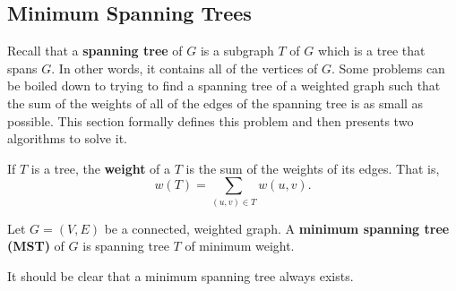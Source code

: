 
%
%




\newpage

\subsection{Minimum Spanning Trees}\label{sec:mst}

Recall that a {\bf spanning tree} of $G$ is a subgraph
$T$ of $G$ which is a tree that spans $G$. 
In other words, it contains all of the vertices of $G$.
Some problems can be boiled down to trying to find a
spanning tree of a weighted graph such that the sum
of the weights of all of the edges of the spanning tree 
is as small as possible. This section formally
defines this problem and then presents two algorithms 
to solve it.

\begin{df}
If $T$ is a tree, the {\bf weight} of a $T$ is the sum of the
weights of its edges.  That is, 
$$w(T)=\sum_{(u,v)\in T} w(u,v).$$
\end{df}

\begin{df}
Let $G=(V,E)$ be a connected, weighted graph.
A {\bf minimum spanning tree (MST)} of $G$ is spanning tree 
$T$ of minimum weight.
\end{df}

It should be clear that a minimum spanning tree always exists.

